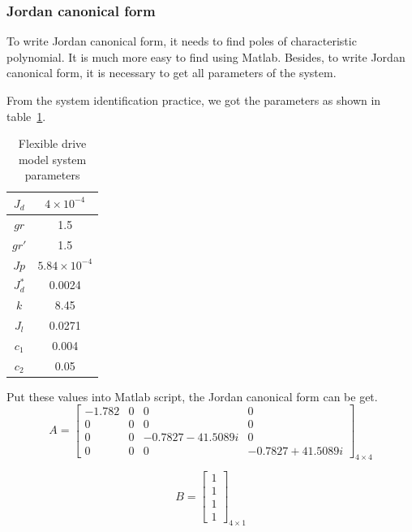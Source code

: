 \documentclass[a4paper, 12pt]{article}
\begin{document}
\subsubsection{Jordan canonical form}
\hspace{2.5ex}To write Jordan canonical form, it needs to find poles of characteristic polynomial. It is much more easy to find using Matlab. Besides, to write Jordan canonical form, it is necessary to get all parameters of the system. 

From the system identification practice, we got the parameters as shown in table~\ref{systemparameters}. 

\begin{table}[!htbp]
\centering
\caption{Flexible drive model system parameters}
\label{systemparameters}
\begin{tabular}{|c|c|}
\hline
$J_d$	&	$4\times 10^{-4}$\\	\hline
$gr$	&	1.5	\\ \hline
$gr'$	&	1.5	\\ \hline
$Jp$	&	$5.84\times 10^{-4}$	\\ \hline
$J_d^*$	&	0.0024	\\ \hline
$k$	&	8.45 \\ \hline
$J_l$	&	0.0271	\\ \hline
$c_1$	&	0.004	\\	\hline
$c_2$	&	0.05	\\	\hline
\end{tabular}
\end{table}

Put these values into Matlab script, the Jordan canonical form can be get.
\begin{equation}\label{flexibleJordanA}
A = \begin{bmatrix}
-1.782	&	0	&	0	&	0	\\
0	&	0	&	0	&	0	\\
0	&	0	&	-0.7827-41.5089i	&	0	\\
0	&	0	&	0	&	-0.7827+41.5089i
\end{bmatrix}_{4\times 4}
\end{equation}

\begin{equation}\label{flexibleJordanB}
B = \begin{bmatrix}
1	\\
1	\\
1	\\
1
\end{bmatrix}_{4\times 1}
\end{equation}
\end{document}
